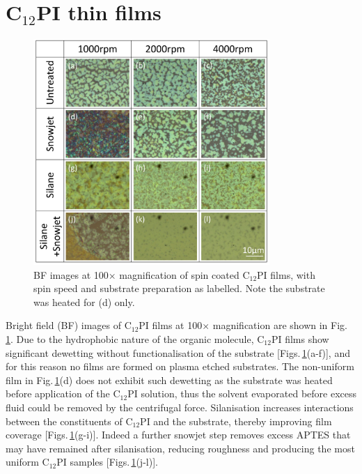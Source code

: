 \section{C$_{12}$PI thin films}
\begin{figure}[h!]
\centering    
\includegraphics[width=0.8\textwidth]{Fig1}
\caption{BF images at 100$\times$ magnification of spin coated C$_{12}$PI films, with spin speed and substrate preparation as labelled. Note the substrate was heated for (d) only.}
\label{4Fig1}
\end{figure}
Bright field (BF) images of C$_{12}$PI films at 100$\times$ magnification are shown in Fig.\,\ref{4Fig1}. Due to the hydrophobic nature of the organic molecule, C$_{12}$PI films show significant dewetting without functionalisation of the substrate [Figs.\,\ref{4Fig1}(a-f)], and for this reason no films are formed on plasma etched substrates. The non-uniform film in Fig.\,\ref{4Fig1}(d) does not exhibit such dewetting as the substrate was heated before application of the C$_{12}$PI solution, thus the solvent evaporated before excess fluid could be removed by the centrifugal force. Silanisation increases interactions between the constituents of C$_{12}$PI and the substrate, thereby improving film coverage [Figs.\,\ref{4Fig1}(g-i)]. Indeed a further snowjet step removes excess APTES that may have remained after silanisation, reducing roughness and producing the most uniform C$_{12}$PI samples [Figs.\,\ref{4Fig1}(j-l)].


